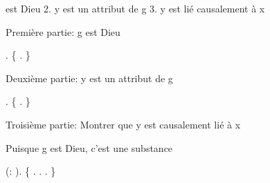 \documentclass[10pt]{report}
\begin{document}
\begin{coqdoccode}
\begin{coqdoccomment}
est\coqdocindent{0.50em}
Dieu\coqdoceol
\coqdocindent{2.50em}
2.\coqdocindent{0.50em}
y\coqdocindent{0.50em}
est\coqdocindent{0.50em}
un\coqdocindent{0.50em}
attribut\coqdocindent{0.50em}
de\coqdocindent{0.50em}
g\coqdoceol
\coqdocindent{2.50em}
3.\coqdocindent{0.50em}
y\coqdocindent{0.50em}
est\coqdocindent{0.50em}
lié\coqdocindent{0.50em}
causalement\coqdocindent{0.50em}
à\coqdocindent{0.50em}
x\coqdocindent{0.50em}
\end{coqdoccomment}
\coqdoceol
\coqdocemptyline
\coqdocindent{1.00em}
\begin{coqdoccomment}
\coqdocindent{0.50em}
Première\coqdocindent{0.50em}
partie:\coqdocindent{0.50em}
g\coqdocindent{0.50em}
est\coqdocindent{0.50em}
Dieu\coqdocindent{0.50em}
\end{coqdoccomment}
\coqdoceol
\coqdocindent{1.00em}
. \{  . \}\coqdoceol
\coqdocindent{1.00em}
\coqdoceol
\coqdocindent{1.00em}
\begin{coqdoccomment}
\coqdocindent{0.50em}
Deuxième\coqdocindent{0.50em}
partie:\coqdocindent{0.50em}
y\coqdocindent{0.50em}
est\coqdocindent{0.50em}
un\coqdocindent{0.50em}
attribut\coqdocindent{0.50em}
de\coqdocindent{0.50em}
g\coqdocindent{0.50em}
\end{coqdoccomment}
\coqdoceol
\coqdocindent{1.00em}
. \{  . \}\coqdoceol
\coqdocindent{1.00em}
\coqdoceol
\coqdocindent{1.00em}
\begin{coqdoccomment}
\coqdocindent{0.50em}
Troisième\coqdocindent{0.50em}
partie:\coqdocindent{0.50em}
Montrer\coqdocindent{0.50em}
que\coqdocindent{0.50em}
y\coqdocindent{0.50em}
est\coqdocindent{0.50em}
causalement\coqdocindent{0.50em}
lié\coqdocindent{0.50em}
à\coqdocindent{0.50em}
x\coqdocindent{0.50em}
\end{coqdoccomment}
\coqdoceol
\coqdocindent{1.00em}
\coqdoceol
\coqdocindent{1.00em}
\begin{coqdoccomment}
\coqdocindent{0.50em}
Puisque\coqdocindent{0.50em}
g\coqdocindent{0.50em}
est\coqdocindent{0.50em}
Dieu,\coqdocindent{0.50em}
c'est\coqdocindent{0.50em}
une\coqdocindent{0.50em}
substance\coqdocindent{0.50em}
\end{coqdoccomment}
\coqdoceol
\coqdocindent{1.00em}
 (:  ).\coqdoceol
\coqdocindent{1.00em}
\{    .  .  . \}\coqdoceol

\end{coqdoccode}
\end{document}
